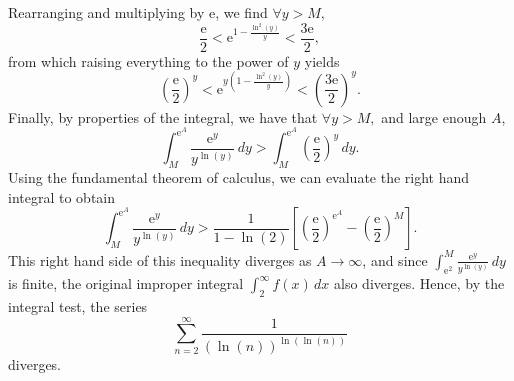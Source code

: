 \documentclass[
  17pt,
  a4paper]{extarticle}
\theoremstyle{plain}
\theoremstyle{definition}
\theoremstyle{plain}
\theoremstyle{plain}
\theoremstyle{plain}
\theoremstyle{plain}
\theoremstyle{definition}
\theoremstyle{definition}
\theoremstyle{remark}
\theoremstyle{remark}
\renewcommand{\;}{\,}
\begin{document}
Rearranging and multiplying by \(\mathrm{e}\), we find \(\forall y > M,\) \[\frac{\mathrm{e}}{2} < \mathrm{e}^{1 - \frac{\ln^2(y)}{y}} < \frac{3\mathrm{e}}{2},\] from which raising everything to the power of \(y\) yields \[\left(\frac{\mathrm{e}}{2}\right)^y < \mathrm{e}^{y\left(1 - \frac{\ln^2(y)}{y}\right)} < \left(\frac{3\mathrm{e}}{2}\right)^y.\] Finally, by properties of the integral, we have that \(\forall y > M,\) and large enough \(A\), \[\int_{M}^{\mathrm{e}^A}\frac{\mathrm{e}^y}{y^{\ln(y)}}\;dy > \int_M^{\mathrm{e}^A}\left(\frac{\mathrm{e}}{2}\right)^y\;dy.\] Using the fundamental theorem of calculus, we can evaluate the right hand integral to obtain \[\int_{M}^{\mathrm{e}^A}\frac{\mathrm{e}^y}{y^{\ln(y)}}\;dy > \frac{1}{1 - \ln(2)}\left[\left(\frac{\mathrm{e}}{2}\right)^{\mathrm{e}^A} - \left(\frac{\mathrm{e}}{2}\right)^{M} \right].\] This right hand side of this inequality diverges as \(A \to \infty\), and since \(\int_{\mathrm{e}^2}^M \frac{\mathrm{e}^y}{y^{\ln(y)}}\;dy\) is finite, the original improper integral \(\int_{2}^{\infty} f(x)\;dx\) also diverges. Hence, by the integral test, the series \[\sum_{n=2}^{\infty}\frac{1}{(\ln(n))^{\ln(\ln(n))}}\] diverges.
\end{document}
